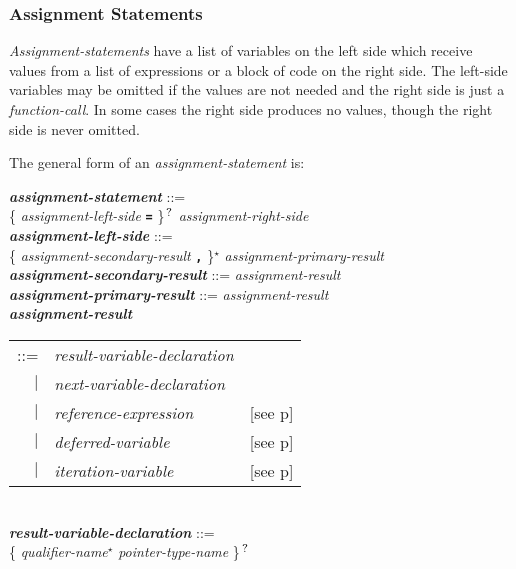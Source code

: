 \documentclass[12pt]{article}
\newcommand{\TT}[1]{{\tt \bfseries #1}}
\newcommand{\STAR}{{\Large $^\star$}}
\newcommand{\QMARK}{{$^{\,\mbox{\footnotesize ?}}$}}
\newcommand{\emkey}[1]{{\em \bfseries #1}}
\newcommand{\pagref}[1]{p\pageref{#1}}
\newenvironment{indpar}[1][0.3in]%
	{\begin{list}{}%
		     {\setlength{\itemsep}{0in}%
		      \setlength{\topsep}{0in}%
		      \setlength{\parsep}{1ex}%
		      \setlength{\labelwidth}{#1}%
		      \setlength{\leftmargin}{#1}%
		      \addtolength{\leftmargin}{\labelsep}}%
	 \item}%
	{\end{list}}
\begin{document}
\subsubsection{Assignment Statements}
\label{ASSIGNMENT-STATEMENTS}

{\em Assignment-statements} have a list of variables on the
left side which receive values from a list of expressions or
a block of code on the right side.  The left-side variables
may be omitted if the values are not needed and the right side
is just a {\em function-call}.  In some cases
the right side produces no values, though the right side is never omitted.

The general form of an {\em assignment-statement} is:
\begin{indpar}
\emkey{assignment-statement} ::= \\
\hspace*{0.5in} \{ {\em assignment-left-side} \TT{=} \}\QMARK{}
	      {\em assignment-right-side}
\\[0.5ex]
\emkey{assignment-left-side} ::= \\
\hspace*{0.5in}
    \{ {\em assignment-secondary-result} \TT{,} \}\STAR{}
    {\em assignment-primary-result}
\\[0.5ex]
\emkey{assignment-secondary-result} ::= {\em assignment-result} \\
\emkey{assignment-primary-result} ::= {\em assignment-result}
\\[0.5ex]
\emkey{assignment-result}
    \begin{tabular}[t]{@{}rll}
    ::= & {\em result-variable-declaration} \\
    $|$ & {\em next-variable-declaration} \\
    $|$ & {\em reference-expression}
    		& [see \pagref{REFERENCE-EXPRESSIONS}] \\
    $|$ & {\em deferred-variable}
    		& [see \pagref{DEFERRED-VARIABLE}] \\
    $|$ & {\em iteration-variable}
    		& [see \pagref{ITERATION-VARIABLE}] \\
    \end{tabular}
\\[0.5ex]
\emkey{result-variable-declaration}\label{RESULT-VARIABLE-DECLARATION} ::= \\
\hspace*{0.5in}
        \{ {\em qualifier-name}\STAR{} {\em pointer-type-name} \}\QMARK{} \\
\hspace*{1.0in}

\end{indpar}
\end{document}
